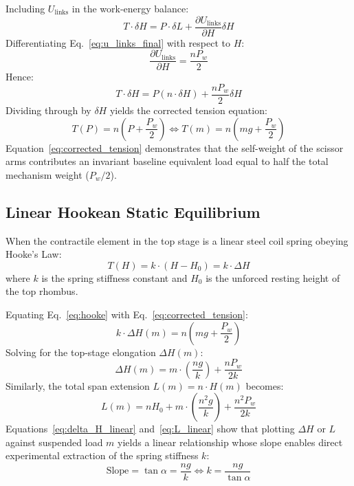 \documentclass[10pt,twocolumn]{article}
\begin{document}
Including $U_{\mathrm{links}}$ in the work-energy balance:
\begin{equation}
    T \cdot \delta H = P \cdot \delta L + \frac{\partial U_{\mathrm{links}}}{\partial H} \delta H
\end{equation}
Differentiating Eq.~\eqref{eq:u_links_final} with respect to $H$:
\begin{equation}
    \frac{\partial U_{\mathrm{links}}}{\partial H} = \frac{n P_w}{2}
\end{equation}
Hence:
\begin{equation}
    T \cdot \delta H = P (n \cdot \delta H) + \frac{n P_w}{2} \delta H
\end{equation}
Dividing through by $\delta H$ yields the corrected tension equation:
\begin{equation}
    T(P) = n \left( P + \frac{P_w}{2} \right) \iff T(m) = n \left( m g + \frac{P_w}{2} \right)
    \label{eq:corrected_tension}
\end{equation}
Equation~\eqref{eq:corrected_tension} demonstrates that the self-weight of the scissor arms contributes an invariant baseline equivalent load equal to half the total mechanism weight ($P_w/2$).

\subsection{Linear Hookean Static Equilibrium}

When the contractile element in the top stage is a linear steel coil spring obeying Hooke's Law:
\begin{equation}
    T(H) = k \cdot (H - H_0) = k \cdot \Delta H
    \label{eq:hooke}
\end{equation}
where $k$ is the spring stiffness constant and $H_0$ is the unforced resting height of the top rhombus.

Equating Eq.~\eqref{eq:hooke} with Eq.~\eqref{eq:corrected_tension}:
\begin{equation}
    k \cdot \Delta H(m) = n \left( m g + \frac{P_w}{2} \right)
\end{equation}
Solving for the top-stage elongation $\Delta H(m)$:
\begin{equation}
    \Delta H(m) = m \cdot \left( \frac{n g}{k} \right) + \frac{n P_w}{2 k}
    \label{eq:delta_H_linear}
\end{equation}
Similarly, the total span extension $L(m) = n \cdot H(m)$ becomes:
\begin{equation}
    L(m) = n H_0 + m \cdot \left( \frac{n^2 g}{k} \right) + \frac{n^2 P_w}{2 k}
    \label{eq:L_linear}
\end{equation}
Equations~\eqref{eq:delta_H_linear} and~\eqref{eq:L_linear} show that plotting $\Delta H$ or $L$ against suspended load $m$ yields a linear relationship whose slope enables direct experimental extraction of the spring stiffness $k$:
\begin{equation}
    \text{Slope} = \tan \alpha = \frac{n g}{k} \iff k = \frac{n g}{\tan \alpha}
    \label{eq:k_extraction}
\end{equation}
\end{document}
